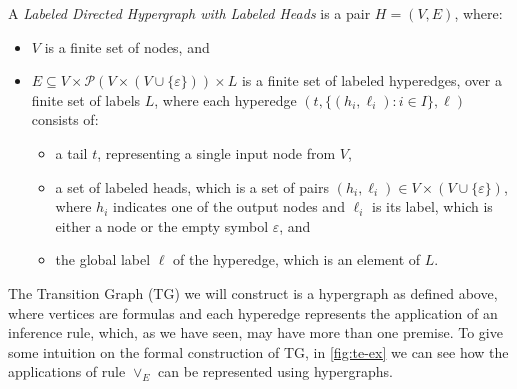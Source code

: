 \begin{definition}
A \emph{Labeled Directed Hypergraph with Labeled Heads} is a pair $H = (V, E)$, where:
\begin{itemize}
  \item \( V \) is a finite set of nodes, and
  \item \( E \subseteq V \times \mathcal{P}(V \times (V \cup \{\varepsilon\})) \times L \) is a finite set of labeled hyperedges, over a finite set of labels $L$, where each hyperedge $(t,\{(h_i,\ell_i): i\in I\}, \ell)$ consists of:
  \begin{itemize}
    \item a tail $t$, representing a single input node from \( V \),
    \item a set of labeled heads, which is a set of pairs \( (h_i, \ell_i) \in V \times (V \cup \{\varepsilon\}) \), where \( h_i \) indicates one of the output nodes and \( \ell_i \) is its label, which is either a node or the empty symbol \( \varepsilon \), and
    \item the global label $\ell$ of the hyperedge, which is an element of \( L \).
  \end{itemize}
\end{itemize}
\end{definition}

The Transition Graph (TG) we will construct is a hypergraph as defined above, where vertices are formulas and each hyperedge represents the application of an inference rule, which, as we have seen, may have more than one premise. 
%
%
%
To give some intuition on the formal construction of TG, in \autoref{fig:te-ex} we can see  how the applications of rule \(\vee_E\) can be represented using hypergraphs.



